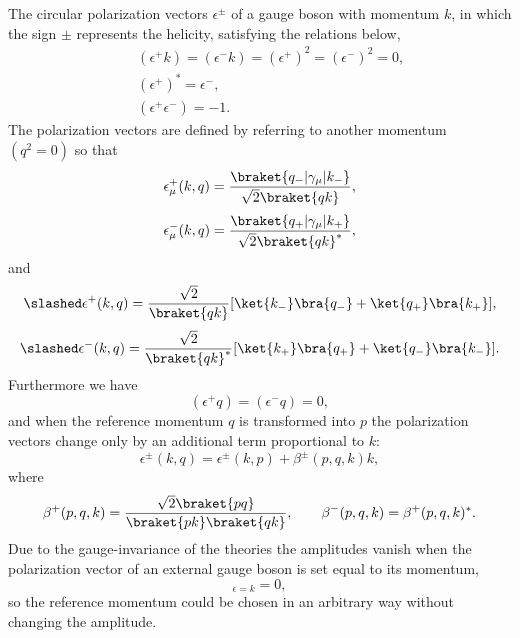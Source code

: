 The circular polarization vectors $\epsilon^\pm$ of a gauge boson with momentum $k$, in which the sign $\pm$ represents the helicity, satisfying the relations below,
\begin{eqnarray}
&&(\epsilon^+ k)=(\epsilon^- k)=(\epsilon^+)^2=(\epsilon^-)^2=0,\nonumber\\
&&(\epsilon^+)^\ast=\epsilon^-,\nonumber\\
&&(\epsilon^+\epsilon^-)=-1.
\end{eqnarray}
The polarization vectors are defined by referring to another momentum $(q^2=0)$ so that \cite{ZZL}
\begin{equation}
\epsilon^+_\mu(k,q)=\frac{\braket{q_-|\gamma_\mu|k_-}}{\sqrt{2}\braket{qk}},
\end{equation}
\begin{equation}
\epsilon^-_\mu(k,q)=\frac{\braket{q_+|\gamma_\mu|k_+}}{\sqrt{2}\braket{qk}^\ast},
\end{equation}
and 
\begin{equation}
\slashed \epsilon^+(k,q)=\frac{\sqrt{2}}{\braket{qk}}[\ket{k_-}\bra{q_-}+\ket{q_+}\bra{k_+}],
\end{equation}
\begin{equation}
\slashed \epsilon^-(k,q)=\frac{\sqrt{2}}{\braket{qk}^\ast}[\ket{k_+}\bra{q_+}+\ket{q_-}\bra{k_-}].
\end{equation}
Furthermore we have 
\begin{equation}
(\epsilon^+q)=(\epsilon^-q)=0,
\end{equation}
and when the reference momentum $q$ is transformed into $p$ the polarization vectors change only by an additional term proportional to $k$:
\begin{equation}
\epsilon^\pm(k,q)=\epsilon^\pm(k,p)+\beta^\pm(p,q,k)k,
\end{equation}
where
\begin{eqnarray}
\beta^+(p,q,k)=\frac{\sqrt{2}\braket{pq}}{\braket{pk}\braket{qk}}, \qquad \beta^-(p,q,k)=\beta^+(p,q,k)^\ast.
\end{eqnarray}
Due to the gauge-invariance of the theories the amplitudes vanish when the polarization vector of an external gauge boson is set equal to its momentum,
\begin{equation}
[M]_{\epsilon=k}=0,
\end{equation}
so the reference momentum could be chosen in an arbitrary way without changing the amplitude.

